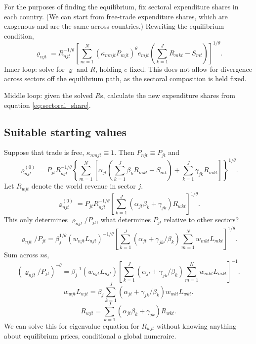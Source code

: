 \documentclass[12pt]{article}
\begin{document}
For the purposes of finding the equilibrium, fix sectoral expenditure shares in each country. (We can start from free-trade expenditure shares, which are exogenous and are the same across countries.) Rewriting the equilibrium condition,
\[
	\varrho_{njt} = R_{njt}^{-1/\theta}
	\left[
	\sum_{m=1}^N
		(\kappa_{mnjt} P_{mjt})^{\theta}
		e_{mjt}
		\left(
			\sum_{k=1}^J R_{mkt}
			-S_{mt}
		\right)
	\right]^{1/\theta}.
\]
Inner loop: solve for $\varrho$ and $R$, holding $e$ fixed. This does not allow for divergence across sectors off the equilibrium path, as the sectoral composition is held fixed.

Middle loop: given the solved $R$s, calculate the new expenditure shares from equation \eqref{eq:sectoral_share}. 

\subsection{Suitable starting values}
Suppose that trade is free, $\kappa_{nmjt}\equiv 1$. Then $P_{njt}\equiv P_{jt}$ and
\begin{equation*}
	\varrho_{njt}^{(0)} = 
	P_{jt}
	R_{njt}^{-1/\theta}
	\left\{
	\sum_{m=1}^N
		\left[
			\alpha_{jt}
			\left(
				\sum_{k=1}^J\beta_k R_{mkt} - S_{mt}
			\right)
			+ \sum_{k=1}^J\gamma_{jk}R_{mkt}
		\right]
	\right\}^{1/\theta}.
\end{equation*}
Let $R_{wjt}$ denote the world revenue in sector $j$.
\begin{equation*}
	\varrho_{njt}^{(0)} = 
	P_{jt}
	R_{njt}^{-1/\theta}
		\left[
				\sum_{k=1}^J
				(\alpha_{jt}\beta_k + \gamma_{jk}) R_{wkt}
		\right]^{1/\theta}.
\end{equation*}
This only determines $\varrho_{njt}/P_{jt}$, what determines $P_{jt}$ relative to other sectors?\begin{equation*}
	\varrho_{njt}/P_{jt} = 
	\beta_j^{1/\theta}
	(w_{njt}L_{njt})^{-1/\theta}
		\left[
				\sum_{k=1}^J
				(\alpha_{jt} + \gamma_{jk}/\beta_k) 
				\sum_{m=1}^N w_{mkt}L_{mkt}
		\right]^{1/\theta}.
\end{equation*}
Sum across $n$s,
\begin{equation*}
	(\varrho_{njt}/P_{jt})^{-\theta} = 
	\beta_j^{-1}
	(w_{njt}L_{njt})
		\left[
				\sum_{k=1}^J
				(\alpha_{jt} + \gamma_{jk}/\beta_k) 
				\sum_{m=1}^N w_{mkt}L_{mkt}
		\right]^{-1}.
\end{equation*}
\begin{equation*}
	w_{wjt}L_{wjt}
	= \beta_j
				\sum_{k=1}^J
				(\alpha_{jt} + \gamma_{jk}/\beta_k) 
				w_{wkt}L_{wkt}.
\end{equation*}
\begin{equation*}
	R_{wjt}
	=
			\sum_{k=1}^J
			(\alpha_{jt}\beta_k + \gamma_{jk}) 
			R_{wkt}.
\end{equation*}
We can solve this for eigenvalue equation for $R_{wjt}$ without knowing anything about equilibrium prices, conditional a global numeraire.
\end{document}

